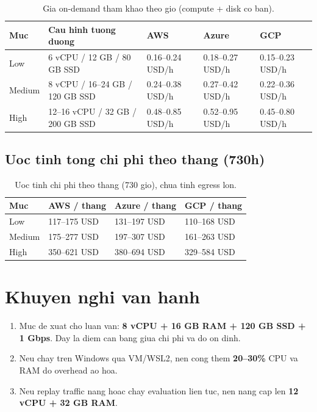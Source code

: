 \documentclass[12pt,a4paper]{article}
\begin{document}
\begin{table}[h!]
\centering
\renewcommand{\arraystretch}{1.2}
\begin{tabular}{p{2.4cm} p{4.2cm} p{3.0cm} p{3.0cm} p{3.0cm}}
\toprule
\textbf{Muc} & \textbf{Cau hinh tuong duong} & \textbf{AWS} & \textbf{Azure} & \textbf{GCP} \\
\midrule
Low & 6 vCPU / 12 GB / 80 GB SSD & 0.16--0.24 USD/h & 0.18--0.27 USD/h & 0.15--0.23 USD/h \\
Medium & 8 vCPU / 16--24 GB / 120 GB SSD & 0.24--0.38 USD/h & 0.27--0.42 USD/h & 0.22--0.36 USD/h \\
High & 12--16 vCPU / 32 GB / 200 GB SSD & 0.48--0.85 USD/h & 0.52--0.95 USD/h & 0.45--0.80 USD/h \\
\bottomrule
\end{tabular}
\caption{Gia on-demand tham khao theo gio (compute + disk co ban).}
\end{table}

\subsection{Uoc tinh tong chi phi theo thang (730h)}

\begin{table}[h!]
\centering
\renewcommand{\arraystretch}{1.2}
\begin{tabular}{p{2.4cm} p{3.8cm} p{3.8cm} p{3.8cm}}
\toprule
\textbf{Muc} & \textbf{AWS / thang} & \textbf{Azure / thang} & \textbf{GCP / thang} \\
\midrule
Low & 117--175 USD & 131--197 USD & 110--168 USD \\
Medium & 175--277 USD & 197--307 USD & 161--263 USD \\
High & 350--621 USD & 380--694 USD & 329--584 USD \\
\bottomrule
\end{tabular}
\caption{Uoc tinh chi phi theo thang (730 gio), chua tinh egress lon.}
\end{table}

\section{Khuyen nghi van hanh}

\begin{enumerate}
	\item Muc de xuat cho luan van: \textbf{8 vCPU + 16 GB RAM + 120 GB SSD + 1 Gbps}. Day la diem can bang giua chi phi va do on dinh.
	\item Neu chay tren Windows qua VM/WSL2, nen cong them \textbf{20--30\%} CPU va RAM do overhead ao hoa.
	\item Neu replay traffic nang hoac chay evaluation lien tuc, nen nang cap len \textbf{12 vCPU + 32 GB RAM}.
\end{enumerate}
\end{document}
